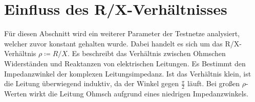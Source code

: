 \section{Einfluss des R/X-Verhältnisses}
\label{sec:rx}


Für diesen Abschnitt wird ein weiterer Parameter der Testnetze analysiert, welcher zuvor konstant gehalten wurde.
Dabei handelt es sich um das R/X-Verhältnis  $\rho \coloneqq R/X$.
Es beschreibt das Verhältnis zwischen Ohmschen Widerständen und Reaktanzen von elektrischen Leitungen.
Es Bestimmt den Impedanzwinkel der komplexen Leitungsimpedanz.
Ist das Verhältnis klein, ist die Leitung überwiegend induktiv, da der Winkel gegen $\frac{\pi}{2}$ läuft.
Bei großen $\rho$-Werten wirkt die Leitung Ohmsch aufgrund eines niedrigen Impedanzwinkels.\\

